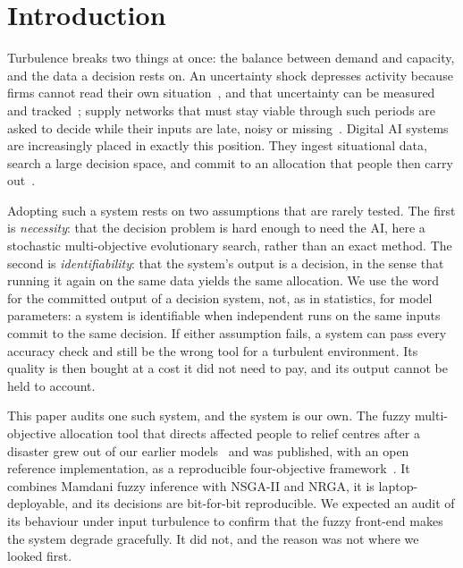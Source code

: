 \documentclass[systems,article,submit,moreauthors,pdftex]{Definitions/mdpi}
\begin{document}
\section{Introduction}\label{sec:intro}

Turbulence breaks two things at once: the balance between demand and capacity, and the
data a decision rests on. An uncertainty shock depresses activity because firms cannot
read their own situation~\cite{bloom2009uncertainty}, and that uncertainty can be measured
and tracked~\cite{baker2016epu}; supply networks that must stay viable through such
periods are asked to decide while their inputs are late, noisy or missing~\cite{ivanov2020viability,ivanov2020covid}.
Digital AI systems are increasingly placed in exactly this position. They ingest
situational data, search a large decision space, and commit to an allocation that people
then carry out~\cite{modgil2022ai,belhadi2024ai,pan2025aiusage}.

Adopting such a system rests on two assumptions that are rarely tested. The first is
\emph{necessity}: that the decision problem is hard enough to need the AI, here a
stochastic multi-objective evolutionary search, rather than an exact method. The second is
\emph{identifiability}: that the system's output is a decision, in the sense that running
it again on the same data yields the same allocation. We use the word for the committed
output of a decision system, not, as in statistics, for model parameters: a system is
identifiable when independent runs on the same inputs commit to the same decision. If
either assumption fails, a system can pass every accuracy check and still be the wrong
tool for a turbulent environment. Its quality is then bought at a cost it did not need to
pay, and its output cannot be held to account.

This paper audits one such system, and the system is our own. The fuzzy multi-objective
allocation tool that directs affected people to relief centres after a disaster grew out of
our earlier models~\cite{rabiei2021vehicle,rabiei2023volunteer} and was published, with
an open reference implementation, as a reproducible four-objective
framework~\cite{rabiei2026resilient}. It combines Mamdani fuzzy inference with NSGA-II and
NRGA, it is laptop-deployable, and its decisions are bit-for-bit reproducible. We expected
an audit of its behaviour under input turbulence to confirm that the fuzzy front-end makes
the system degrade gracefully. It did not, and the reason was not where we looked first.
\end{document}
